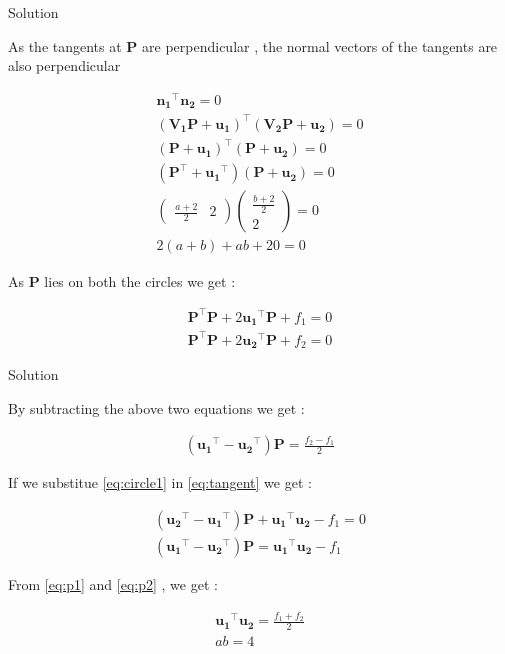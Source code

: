 \documentclass{beamer}
\numberwithin{equation}{section}
\theoremstyle{remark}
\newcommand{\myvec}[1]{\ensuremath{\begin{pmatrix}#1\end{pmatrix}}}
\let\vec\mathbf
\begin{document}
\begin{frame}{Solution}

As the tangents at $\vec{P}$ are perpendicular , the normal vectors of the tangents are also perpendicular 

\begin{align}
  \vec{n_1}^\top\vec{n_2} = 0\\
  (\vec{V_1}\vec{P}+\vec{u_1})^\top(\vec{V_2}\vec{P}+\vec{u_2}) = 0\\
  (\vec{P}+\vec{u_1})^\top(\vec{P}+\vec{u_2}) = 0\\
  (\vec{P}^\top+\vec{u_1}^\top)(\vec{P}+\vec{u_2}) = 0 \label{eq:tangent} \\
  \myvec{\tfrac{a+2}{2} & 2}\myvec{\tfrac{b+2}{2}\\2} = 0\\
  2(a+b) + ab + 20 = 0  \label{eq:a+b} 
\end{align}

As $\vec{P}$ lies on both the circles we get :

\begin{align}
  \vec{P}^\top \vec{P} + 2\vec{u_1}^\top \vec{P} + f_1 = 0 \label{eq:circle1} \\
  \vec{P}^\top \vec{P} + 2\vec{u_2}^\top \vec{P} + f_2 = 0 
\end{align}

\end{frame}

\begin{frame}{Solution}

By subtracting the above two equations we get :

\begin{align}
  (\vec{u_1}^\top - \vec{u_2}^\top)\vec{P} = \frac{f_2 - f_1}{2} \label{eq:p1} 
\end{align}

If we substitue \eqref{eq:circle1} in \eqref{eq:tangent} we get :

\begin{align}
  (\vec{u_2}^\top - \vec{u_1}^\top)\vec{P} + \vec{u_1}^\top\vec{u_2} - f_1 = 0\\
  (\vec{u_1}^\top - \vec{u_2}^\top)\vec{P} = \vec{u_1}^\top\vec{u_2} - f_1   \label{eq:p2} 
\end{align}

From \eqref{eq:p1} and \eqref{eq:p2} , we get :

\begin{align}
  \vec{u_1}^\top\vec{u_2} = \frac{f_1+f_2}{2}\\
  ab = 4  \label{eq:ab}
\end{align}

\end{frame}
\end{document}
